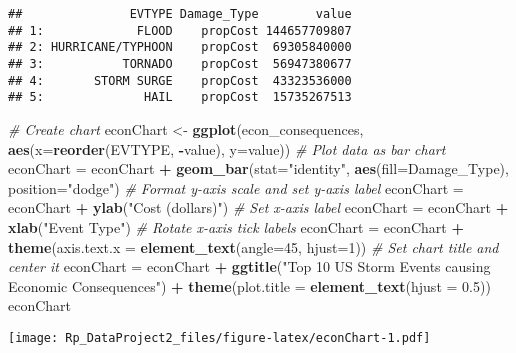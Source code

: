 \documentclass[]{article}
\newenvironment{Shaded}{\begin{snugshade}}{\end{snugshade}}
\newcommand{\KeywordTok}[1]{\textcolor[rgb]{0.13,0.29,0.53}{\textbf{#1}}}
\newcommand{\DataTypeTok}[1]{\textcolor[rgb]{0.13,0.29,0.53}{#1}}
\newcommand{\DecValTok}[1]{\textcolor[rgb]{0.00,0.00,0.81}{#1}}
\newcommand{\FloatTok}[1]{\textcolor[rgb]{0.00,0.00,0.81}{#1}}
\newcommand{\StringTok}[1]{\textcolor[rgb]{0.31,0.60,0.02}{#1}}
\newcommand{\CommentTok}[1]{\textcolor[rgb]{0.56,0.35,0.01}{\textit{#1}}}
\newcommand{\OperatorTok}[1]{\textcolor[rgb]{0.81,0.36,0.00}{\textbf{#1}}}
\newcommand{\NormalTok}[1]{#1}
\begin{document}
\begin{verbatim}
##               EVTYPE Damage_Type        value
## 1:             FLOOD    propCost 144657709807
## 2: HURRICANE/TYPHOON    propCost  69305840000
## 3:           TORNADO    propCost  56947380677
## 4:       STORM SURGE    propCost  43323536000
## 5:              HAIL    propCost  15735267513
\end{verbatim}

\begin{Shaded}
\begin{Highlighting}[]
\CommentTok{# Create chart}
\NormalTok{econChart <-}\StringTok{ }\KeywordTok{ggplot}\NormalTok{(econ_consequences, }\KeywordTok{aes}\NormalTok{(}\DataTypeTok{x=}\KeywordTok{reorder}\NormalTok{(EVTYPE, }\OperatorTok{-}\NormalTok{value), }\DataTypeTok{y=}\NormalTok{value))}
\CommentTok{# Plot data as bar chart}
\NormalTok{econChart =}\StringTok{ }\NormalTok{econChart }\OperatorTok{+}\StringTok{ }\KeywordTok{geom_bar}\NormalTok{(}\DataTypeTok{stat=}\StringTok{"identity"}\NormalTok{, }\KeywordTok{aes}\NormalTok{(}\DataTypeTok{fill=}\NormalTok{Damage_Type), }\DataTypeTok{position=}\StringTok{"dodge"}\NormalTok{)}
\CommentTok{# Format y-axis scale and set y-axis label}
\NormalTok{econChart =}\StringTok{ }\NormalTok{econChart }\OperatorTok{+}\StringTok{ }\KeywordTok{ylab}\NormalTok{(}\StringTok{"Cost (dollars)"}\NormalTok{) }
\CommentTok{# Set x-axis label}
\NormalTok{econChart =}\StringTok{ }\NormalTok{econChart }\OperatorTok{+}\StringTok{ }\KeywordTok{xlab}\NormalTok{(}\StringTok{"Event Type"}\NormalTok{) }
\CommentTok{# Rotate x-axis tick labels }
\NormalTok{econChart =}\StringTok{ }\NormalTok{econChart }\OperatorTok{+}\StringTok{ }\KeywordTok{theme}\NormalTok{(}\DataTypeTok{axis.text.x =} \KeywordTok{element_text}\NormalTok{(}\DataTypeTok{angle=}\DecValTok{45}\NormalTok{, }\DataTypeTok{hjust=}\DecValTok{1}\NormalTok{))}
\CommentTok{# Set chart title and center it}
\NormalTok{econChart =}\StringTok{ }\NormalTok{econChart }\OperatorTok{+}\StringTok{ }\KeywordTok{ggtitle}\NormalTok{(}\StringTok{"Top 10 US Storm Events causing Economic Consequences"}\NormalTok{) }\OperatorTok{+}\StringTok{ }\KeywordTok{theme}\NormalTok{(}\DataTypeTok{plot.title =} \KeywordTok{element_text}\NormalTok{(}\DataTypeTok{hjust =} \FloatTok{0.5}\NormalTok{))}
\NormalTok{econChart}
\end{Highlighting}
\end{Shaded}

\texttt{[image: Rp\_DataProject2\_files/figure-latex/econChart-1.pdf]}
\end{document}
